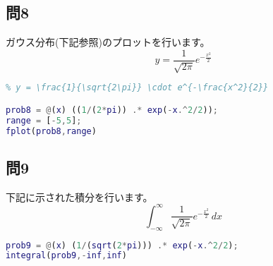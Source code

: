 \documentclass[dvipdfmx]{article}				%
\begin{document}
\subsection*{問8}

ガウス分布(下記参照)のプロットを行います。\\
\[
y = \frac{1}{\sqrt{2\pi}} e^{-\frac{x^2}{2}}
\]

\begin{lstlisting}[language=Matlab]
% ガウス分布のグラフをプロット
% y = \frac{1}{\sqrt{2\pi}} \cdot e^{-\frac{x^2}{2}}

prob8 = @(x) ((1/(2*pi)) .* exp(-x.^2/2));
range = [-5,5];
fplot(prob8,range)
\end{lstlisting}



\subsection*{問9}
下記に示された積分を行います。
\[
\int_{-\infty}^{\infty} \frac{1}{\sqrt{2\pi}} e^{-\frac{x^2}{2}} \, dx
\]

\begin{lstlisting}[language=Matlab]
prob9 = @(x) (1/(sqrt(2*pi))) .* exp(-x.^2/2);
integral(prob9,-inf,inf)
\end{lstlisting}
\end{document}
